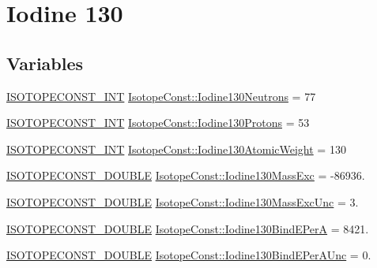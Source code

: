\hypertarget{group___isotope_const-_iodine-_i130}{}\section{Iodine 130}
\label{group___isotope_const-_iodine-_i130}
\subsection*{Variables}
\begin{DoxyCompactItemize}
\item 
\mbox{\hyperlink{group___isotope_const-_macros_ga5f18360b3e99483a35c32d789e62621c}{I\+S\+O\+T\+O\+P\+E\+C\+O\+N\+S\+T\+\_\+\+I\+NT}} \mbox{\hyperlink{group___isotope_const-_iodine-_i130_gaead3095c79ed84981f951b1bc5b53bd6}{Isotope\+Const\+::\+Iodine130\+Neutrons}} = 77
\item 
\mbox{\hyperlink{group___isotope_const-_macros_ga5f18360b3e99483a35c32d789e62621c}{I\+S\+O\+T\+O\+P\+E\+C\+O\+N\+S\+T\+\_\+\+I\+NT}} \mbox{\hyperlink{group___isotope_const-_iodine-_i130_gaab657478cd5e06995466a39566e5563f}{Isotope\+Const\+::\+Iodine130\+Protons}} = 53
\item 
\mbox{\hyperlink{group___isotope_const-_macros_ga5f18360b3e99483a35c32d789e62621c}{I\+S\+O\+T\+O\+P\+E\+C\+O\+N\+S\+T\+\_\+\+I\+NT}} \mbox{\hyperlink{group___isotope_const-_iodine-_i130_ga708cb69afffaa589eaba4b929d389589}{Isotope\+Const\+::\+Iodine130\+Atomic\+Weight}} = 130
\item 
\mbox{\hyperlink{group___isotope_const-_macros_ga8f45a7272ce02c0b4c65c44636ed719a}{I\+S\+O\+T\+O\+P\+E\+C\+O\+N\+S\+T\+\_\+\+D\+O\+U\+B\+LE}} \mbox{\hyperlink{group___isotope_const-_iodine-_i130_ga355c57065cd0d3748b41a8986c4222c5}{Isotope\+Const\+::\+Iodine130\+Mass\+Exc}} = -\/86936.
\item 
\mbox{\hyperlink{group___isotope_const-_macros_ga8f45a7272ce02c0b4c65c44636ed719a}{I\+S\+O\+T\+O\+P\+E\+C\+O\+N\+S\+T\+\_\+\+D\+O\+U\+B\+LE}} \mbox{\hyperlink{group___isotope_const-_iodine-_i130_gaf71dede910b565c379a5dc803bb50ae7}{Isotope\+Const\+::\+Iodine130\+Mass\+Exc\+Unc}} = 3.
\item 
\mbox{\hyperlink{group___isotope_const-_macros_ga8f45a7272ce02c0b4c65c44636ed719a}{I\+S\+O\+T\+O\+P\+E\+C\+O\+N\+S\+T\+\_\+\+D\+O\+U\+B\+LE}} \mbox{\hyperlink{group___isotope_const-_iodine-_i130_gad4c29dc84300e83a4145f8448aef9ac4}{Isotope\+Const\+::\+Iodine130\+Bind\+E\+PerA}} = 8421.
\item 
\mbox{\hyperlink{group___isotope_const-_macros_ga8f45a7272ce02c0b4c65c44636ed719a}{I\+S\+O\+T\+O\+P\+E\+C\+O\+N\+S\+T\+\_\+\+D\+O\+U\+B\+LE}} \mbox{\hyperlink{group___isotope_const-_iodine-_i130_ga28cb5e90df4d01f71f136dbfe5c6f956}{Isotope\+Const\+::\+Iodine130\+Bind\+E\+Per\+A\+Unc}} = 0.

\end{DoxyCompactItemize}
